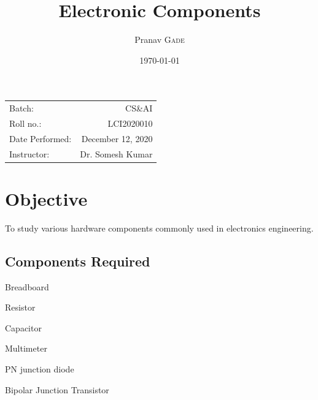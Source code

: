 \documentclass{article}
\title{Electronic Components} %
\author{Pranav \textsc{Gade}} %
\date{\today} %
\begin{document}
\maketitle %

\begin{center}
\begin{tabular}{l r}
Batch: & CS\&AI \\
Roll no.: & LCI2020010 \\
Date Performed: & December 12, 2020 \\ %
Instructor: & Dr. Somesh Kumar %
\end{tabular}
\end{center}



\section{Objective}

To study various hardware components commonly used in electronics engineering.


\subsection{Components Required}
\label{definitions}
\begin{description}
\setlength\itemsep{0em}
\item Breadboard
\item Resistor
\item Capacitor
\item Multimeter
\item PN junction diode
\item Bipolar Junction Transistor
\end{description} 
 
\end{document}
